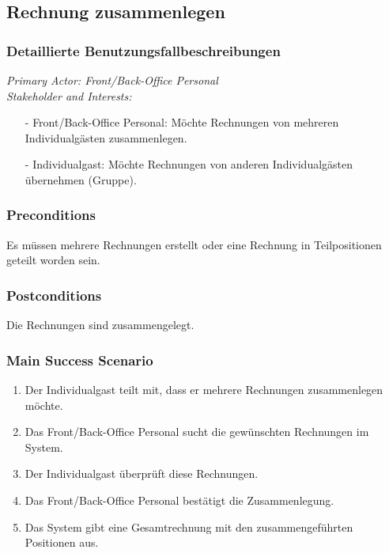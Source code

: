 \documentclass[./detailed_overview_usecases.tex]{subfiles}
\begin{document}
    \subsection{Rechnung zusammenlegen}
    \subsubsection{Detaillierte Benutzungsfallbeschreibungen}
    \textit{Primary Actor: Front/Back-Office Personal}
    \\
    \textit{Stakeholder and Interests:}
    \begin{itemize}
        \item[-] Front/Back-Office Personal: Möchte Rechnungen von mehreren Individualgästen zusammenlegen.
        \item[-] Individualgast: Möchte Rechnungen von anderen Individualgästen übernehmen (Gruppe).
    \end{itemize}

    \subsubsection*{Preconditions}
    Es müssen mehrere Rechnungen erstellt oder eine Rechnung in Teilpositionen geteilt worden sein.

    \subsubsection*{Postconditions}
    Die Rechnungen sind zusammengelegt.

    \subsubsection*{Main Success Scenario}
    \begin{enumerate}
        \item Der Individualgast teilt mit, dass er mehrere Rechnungen zusammenlegen möchte.
        \item Das Front/Back-Office Personal sucht die gewünschten Rechnungen im System.
        \item Der Individualgast überprüft diese Rechnungen.
        \item Das Front/Back-Office Personal bestätigt die Zusammenlegung.
        \item Das System gibt eine Gesamtrechnung mit den zusammengeführten Positionen aus.
    \end{enumerate}
\end{document}

